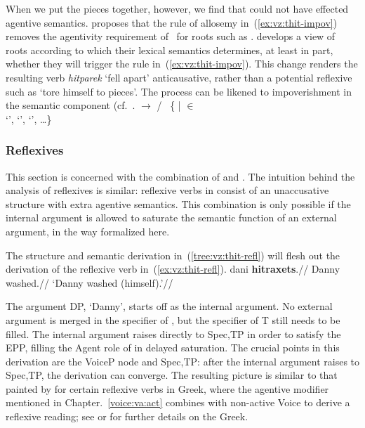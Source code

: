 {When we put the pieces together, however, we find that {\va} could not have effected agentive semantics. \cite{kastner17gjgl} proposes that the rule of allosemy in~(\ref{ex:vz:thit-impov}) removes the agentivity requirement of {\va}~for roots such as . \cite{kastner16phd,kastner17gjgl} develops a view of roots according to which their lexical semantics determines, at least in part, whether they will trigger the rule in~(\ref{ex:vz:thit-impov}). This change renders the resulting verb \emph{hitparek} `fell apart' anticausative, rather than a potential reflexive such as `tore himself to pieces'. The process can be likened to impoverishment \citep{bonet91,noyer98} in the semantic component (cf.~\citealt{nevins15roots}.
\ex\label{ex:vz:thit-impov}\denote{\va~\!} $\rightarrow$ {\zero} / {\vz} \trace~\{ | 
  $\in$ 
 \\ \phantom{a} \hfill 
	 `',  `',  `', \dots\}
\xe



	\subsubsection{Reflexives}
This section is concerned with the combination of {\va} and {\vz}. The intuition behind the analysis of reflexives is similar: reflexive verbs in {\thit} consist of an unaccusative structure with extra agentive semantics. This combination is only possible if the internal argument is allowed to saturate the semantic function of an external argument, in the way formalized here.

The structure and semantic derivation in~(\ref{tree:vz:thit-refl}) will flesh out the derivation of the reflexive verb in~(\ref{ex:vz:thit-refl}).
\ex \label{ex:vz:thit-refl}
\begingl
\gla dani \textbf{hitraxets}.//
\glb Danny washed.//
\glft `Danny washed (himself).'//
\endgl
\xe

The argument DP, `Danny', starts off as the internal argument. No external argument is merged in the specifier of {\vz}, but the specifier of T still needs to be filled. The internal argument raises directly to Spec,TP in order to satisfy the EPP, filling the Agent role of {\vz} in delayed saturation. The crucial points in this derivation are the VoiceP node and Spec,TP: after the internal argument raises to Spec,TP, the derivation can converge. The resulting picture is similar to that painted by \cite{spathasetal15} for certain reflexive verbs in Greek, where the agentive modifier mentioned in Chapter.~\ref{voice:va:act} combines with non-active Voice to derive a reflexive reading; see \cite{spathasetal15} or \cite{kastner17gjgl} for further details on the Greek.

}
